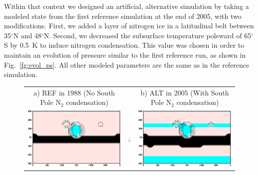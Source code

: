 Within that context we designed an artificial, alternative simulation by taking 
a modeled state from the first reference simulation at the end of 2005, with two modifications.
First,
we added a layer of nitrogen ice in a latitudinal belt between 35$^\circ$N and 48$^\circ$N.
Second, we
decreased the subsurface temperature poleward of 65$^\circ$S by 0.5~K to induce nitrogen condensation.
This value was chosen in order to maintain an evolution of pressure similar to the first reference run, as
shown in  Fig.~\ref{fg:evol_ps}. All other modeled parameters are the same as in the reference simulation.

\begin{figure}
  \begin{center}
\begin{tabular}[h]{ccc} 
\hspace{-1.cm}
   a) REF in 1988 (No South Pole N$_2$ condensation) & & b) ALT in 2005 (With South Pole N$_2$ condensation)\\
\hspace{-1.cm}
   \includegraphics[width=7.cm,angle=-0,clip]{figures/map_ini1988.eps} &
   \includegraphics[width=1.4cm,angle=-0,clip]{figures/map_ini_legend.eps} &
   \includegraphics[width=7.cm,angle=-0,clip]{figures/map_ini2005_pole.eps}  \\
\end{tabular}

\end{center}
\end{figure}
